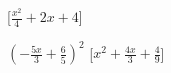 \begin{esercizio}
\begin{multicols}{2}
\begin{enumeratea}
  \hfill [\(\frac{x^{2}}{4} + 2 x + 4\)]
\item \(\left(- \frac{5 x}{3} + \frac{6}{5}\right)^{2}\)
  \hfill [\(x^{2} + \frac{4 x}{3} + \frac{4}{9}\)]
\end{enumeratea}
\end{multicols}
\end{esercizio}

